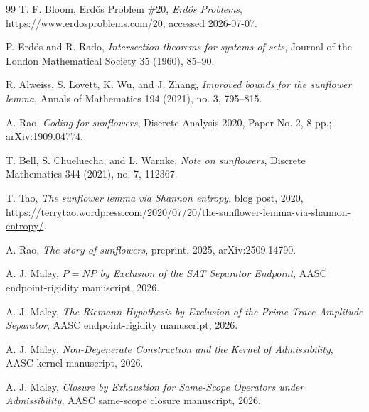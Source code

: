 \documentclass[11pt]{article}
\begin{document}
\begin{thebibliography}{99}
T. F. Bloom, Erd\H{o}s Problem \#20, \emph{Erd\H{o}s Problems}, \url{https://www.erdosproblems.com/20}, accessed 2026-07-07.

P. Erd\H{o}s and R. Rado, \emph{Intersection theorems for systems of sets}, Journal of the London Mathematical Society 35 (1960), 85--90.

R. Alweiss, S. Lovett, K. Wu, and J. Zhang, \emph{Improved bounds for the sunflower lemma}, Annals of Mathematics 194 (2021), no. 3, 795--815.

A. Rao, \emph{Coding for sunflowers}, Discrete Analysis 2020, Paper No. 2, 8 pp.; arXiv:1909.04774.

T. Bell, S. Chueluecha, and L. Warnke, \emph{Note on sunflowers}, Discrete Mathematics 344 (2021), no. 7, 112367.

T. Tao, \emph{The sunflower lemma via Shannon entropy}, blog post, 2020, \url{https://terrytao.wordpress.com/2020/07/20/the-sunflower-lemma-via-shannon-entropy/}.

A. Rao, \emph{The story of sunflowers}, preprint, 2025, arXiv:2509.14790.

A. J. Maley, \emph{$P=NP$ by Exclusion of the SAT Separator Endpoint}, AASC endpoint-rigidity manuscript, 2026.

A. J. Maley, \emph{The Riemann Hypothesis by Exclusion of the Prime-Trace Amplitude Separator}, AASC endpoint-rigidity manuscript, 2026.

A. J. Maley, \emph{Non-Degenerate Construction and the Kernel of Admissibility}, AASC kernel manuscript, 2026.

A. J. Maley, \emph{Closure by Exhaustion for Same-Scope Operators under Admissibility}, AASC same-scope closure manuscript, 2026.
\end{thebibliography}
\end{document}
